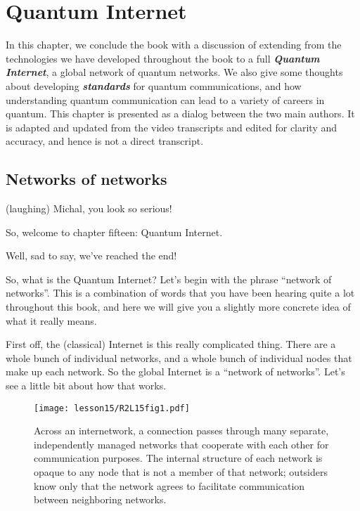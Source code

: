 \chapter{Quantum Internet}

In this chapter, we conclude the book with a discussion of extending from the technologies we have developed throughout the book to a full \textbf{\emph{Quantum Internet}}, a global network of quantum networks.
We also give some thoughts about developing \textbf{\emph{standards}} for quantum communications, and how understanding quantum communication can lead to a variety of careers in quantum. This chapter is presented as a dialog between the two main authors. It is adapted and updated from the video transcripts and edited for clarity and accuracy, and hence is not a direct transcript.

\section{Networks of networks}

\rrr (laughing) Michal, you look so serious!

So, welcome to chapter fifteen: Quantum Internet.

\mmm Well, sad to say, we've reached the end!

So, what is the Quantum Internet?
Let's begin with the phrase ``network of networks''.
This is a combination of words that you have been hearing quite a lot throughout this book, and here we will give you a slightly more concrete idea of what it really means.

\rrr First off, the (classical) Internet is this really complicated thing. There are a whole bunch of individual networks, and a whole bunch of individual nodes that make up each network. So the global Internet is a ``network of networks''. Let's see a little bit about how that works.

\begin{figure}[t]
    \centering
    \texttt{[image: lesson15/R2L15fig1.pdf]}
    \caption[Network of Networks.]{Across an internetwork, a connection passes through many separate, independently managed networks that cooperate with each other for communication purposes. The internal structure of each network is opaque to any node that is not a member of that network; outsiders know only that the network agrees to facilitate communication between neighboring networks.}
    \label{fig:15-1-NofN}
\end{figure}

